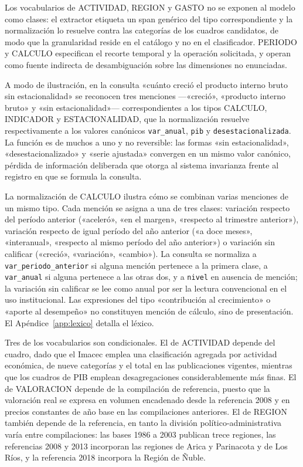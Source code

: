 \documentclass[11pt]{article}
\begin{document}
Los vocabularios de ACTIVIDAD, REGION y GASTO no se exponen al modelo como
clases: el extractor etiqueta un span genérico del tipo correspondiente y la
normalización lo resuelve contra las categorías de los cuadros candidatos, de
modo que la granularidad reside en el catálogo y no en el clasificador. PERIODO
y CALCULO especifican el recorte temporal y la operación solicitada, y operan
como fuente indirecta de desambiguación sobre las dimensiones no enunciadas.

A modo de ilustración, en la consulta «cuánto creció el producto interno bruto
sin estacionalidad» se reconocen tres menciones ---«creció», «producto interno
bruto» y «sin estacionalidad»--- correspondientes a los tipos CALCULO, INDICADOR
y ESTACIONALIDAD, que la normalización resuelve respectivamente a los valores
canónicos \texttt{var\_anual}, \texttt{pib} y \texttt{desestacionalizada}. La
función es de muchos a uno y no reversible: las formas «sin estacionalidad»,
«desestacionalizado» y «serie ajustada» convergen en un mismo valor canónico,
pérdida de información deliberada que otorga al sistema invarianza frente al
registro en que se formula la consulta.

La normalización de CALCULO ilustra cómo se combinan varias menciones de un
mismo tipo. Cada mención se asigna a una de tres clases: variación respecto del
período anterior («aceleró», «en el margen», «respecto al trimestre anterior»),
variación respecto de igual período del año anterior («a doce meses»,
«interanual», «respecto al mismo período del año anterior») o variación sin
calificar («creció», «variación», «cambio»). La consulta se normaliza a
\texttt{var\_periodo\_anterior} si alguna mención pertenece a la primera clase, a
\texttt{var\_anual} si alguna pertenece a las otras dos, y a \texttt{nivel} en
ausencia de mención; la variación sin calificar se lee como anual por ser la
lectura convencional en el uso institucional. Las expresiones del tipo
«contribución al crecimiento» o «aporte al desempeño» no constituyen mención de
cálculo, sino de presentación. El Apéndice~\ref{app:lexico} detalla el léxico.

Tres de los vocabularios son condicionales. El de ACTIVIDAD depende del cuadro,
dado que el Imacec emplea una clasificación agregada por actividad económica, de
nueve categorías y el total en las publicaciones vigentes, mientras que los cuadros de PIB
emplean desagregaciones considerablemente más finas. El de VALORACION depende de
la compilación de referencia, puesto que la valoración real se expresa en volumen
encadenado desde la referencia 2008 y en precios constantes de año base en las
compilaciones anteriores. El de REGION también depende de la referencia, en tanto
la división político-administrativa varía entre compilaciones: las bases 1986 a
2003 publican trece regiones, las referencias 2008 y 2013 incorporan las regiones
de Arica y Parinacota y de Los Ríos, y la referencia 2018 incorpora la Región de
Ñuble.
\end{document}
